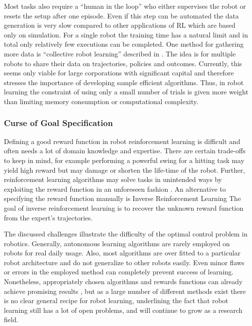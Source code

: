 Most tasks also require a ``human in the loop'' who either
supervises the robot
or resets the setup after one episode. Even if this step
can be automated the data generation is very slow
compared to other applications of RL which are based only on simulation.
For a single robot the training time has a natural limit
and in total only relatively few executions can be completed.
One method for gathering more data is ``collective robot learning''
described in
\citet{kehoe2015survey}. The idea is for multiple robots to
share their data on trajectories, policies and outcomes.
Currently, this seems only
viable for large corporations with significant capital and therefore
stresses the importance of developing sample efficient algorithms.
Thus, in robot learning the constraint of using only a small number of trials
is given more weight than limiting memory consumption or
computational complexity.


\subsubsection{Curse of Goal Specification}
Defining a good reward function in robot reinforcement learning is
difficult and often needs a lot of domain knowledge and expertise.
There are certain trade-offs to keep in mind, for example performing
a powerful swing for a hitting task may yield high reward but may damage
or shorten the life-time of the robot.
Further, reinforcement learning algorithms may solve tasks
in unintended ways by exploiting the reward function in an unforeseen fashion
\citep{ng1999policy}.
An alternative to specifying the reward function manually
is Inverse Reinforcement Learning \citep{russell1998learning}
The goal of inverse reinforcement learning is to recover the unknown
reward function from the expert's trajectories.


$$~$$
The discussed challenges illustrate the difficulty of the optimal control
problem in robotics.
Generally, autonomous learning algorithms are rarely employed on robots
for real daily usage. Also, most
algorithms are over fitted to a particular robot architecture
and do not generalize to other robots easily.
Even minor flaws or errors in the employed method can completely prevent
success of learning.
Nonetheless, appropriately chosen algorithms and rewards functions
can already achieve promising results \citep{kober2013reinforcement}, but as 
a large number of different methods exist 
there is no clear general recipe for robot learning,
underlining the fact that robot learning still has a lot of open problems,
and will continue to grow as a research field.

